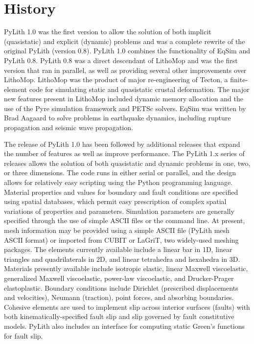 \section{History}

PyLith 1.0 was the first version to allow the solution of both
implicit (quasistatic) and explicit (dynamic) problems and was a
complete rewrite of the original PyLith (version 0.8). PyLith 1.0
combines the functionality of EqSim
\cite{Aagaard:etal:2001a,Aagaard:etal:2001b} and PyLith 0.8. PyLith
0.8 was a direct descendant of LithoMop and was the first version that
ran in parallel, as well as providing several other improvements over
LithoMop. LithoMop was the product of major re-engineering of Tecton, a
finite-element code for simulating static and quasistatic crustal
deformation. The major new features present in LithoMop included
dynamic memory allocation and the use of the Pyre simulation framework
and PETSc solvers. EqSim was written by Brad Aagaard to solve problems
in earthquake dynamics, including rupture propagation and seismic wave
propagation.

The release of PyLith 1.0 has been followed by additional releases
that expand the number of features as well as improve performance.
The PyLith 1.x series of releases allows the solution of both
quasistatic and dynamic problems in one, two, or three
dimensions. The code runs in either serial or parallel, and the design
allows for relatively easy scripting using the Python programming
language. Material properties and values for boundary and fault
conditions are specified using spatial databases, which permit easy
prescription of complex spatial variations of properties and
parameters. Simulation parameters are generally specified through the
use of simple ASCII files or the command line.  At present, mesh
information may be provided using a simple ASCII file (PyLith mesh
ASCII format) or imported from CUBIT or LaGriT, two widely-used
meshing packages. The elements currently available include a linear
bar in 1D, linear triangles and quadrilaterals in 2D, and linear
tetrahedra and hexahedra in 3D. Materials presently available include
isotropic elastic, linear Maxwell viscoelastic, generalized Maxwell
viscoelastic, power-law viscoelastic, and Drucker-Prager
elastoplastic. Boundary conditions include Dirichlet (prescribed
displacements and velocities), Neumann (traction), point forces, and
absorbing boundaries.  Cohesive elements are used to implement slip
across interior surfaces (faults) with both kinematically-specified
fault slip and slip governed by fault constitutive models. PyLith also
includes an interface for computing static Green's functions for fault
slip.

